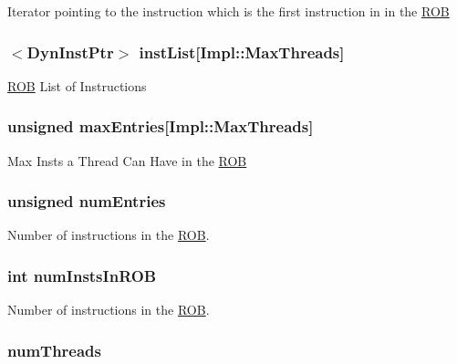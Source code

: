 \label{classROB_ae6c12b73bfe6227eded2623bf432805b}
Iterator pointing to the instruction which is the first instruction in in the \hyperlink{classROB}{ROB} \hypertarget{classROB_a7f2828a4f877a4a4d4b85a6788536b82}{
\subsubsection[{instList}]{$<${\bf DynInstPtr}$>$ {\bf instList}\mbox{[}Impl::MaxThreads\mbox{]}}}
\label{classROB_a7f2828a4f877a4a4d4b85a6788536b82}
\hyperlink{classROB}{ROB} List of Instructions \hypertarget{classROB_a51e5f9f0cb40d61e95b1518f1be90b73}{
\subsubsection[{maxEntries}]{\setlength{\rightskip}{0pt plus 5cm}unsigned {\bf maxEntries}\mbox{[}Impl::MaxThreads\mbox{]}}}
\label{classROB_a51e5f9f0cb40d61e95b1518f1be90b73}
Max Insts a Thread Can Have in the \hyperlink{classROB}{ROB} \hypertarget{classROB_a325de474a9f6652329339d9fc2ea09c0}{
\subsubsection[{numEntries}]{\setlength{\rightskip}{0pt plus 5cm}unsigned {\bf numEntries}}}
\label{classROB_a325de474a9f6652329339d9fc2ea09c0}
Number of instructions in the \hyperlink{classROB}{ROB}. \hypertarget{classROB_a191acd130c66ac40c8bfa8f59febe417}{
\subsubsection[{numInstsInROB}]{\setlength{\rightskip}{0pt plus 5cm}int {\bf numInstsInROB}}}
\label{classROB_a191acd130c66ac40c8bfa8f59febe417}
Number of instructions in the \hyperlink{classROB}{ROB}. \hypertarget{classROB_a88377f855dbf5adeeecb06b5bb821d35}{
\subsubsection[{numThreads}]{ {\bf numThreads}}}
